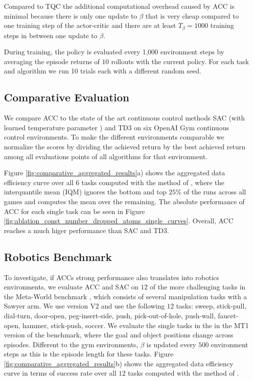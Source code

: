 Compared to TQC the additional computational overhead caused by ACC is minimal because there is only one update to $\beta$ that is very cheap compared to one training step of the actor-critic and there are at least $T_\beta =1000$ training steps in between one update to $\beta$.





During training, the policy is evaluated every 1,000 environment steps by averaging the episode returns of $10$ rollouts with the current policy. For each task and algorithm we run 10 trials each with a different random seed.



\subsection{Comparative Evaluation}




We compare ACC to the state of the art continuous control methods SAC \cite{SAC} (with learned temperature parameter \cite{SACalgapp}) and TD3 \cite{td3} on six OpenAI Gym continuous control environments.
To make the different environments comparable we normalize the scores by dividing the achieved return by the best achieved return among all evaluations points of all algorithms for that environment.

Figure \ref{fig:comparative_aggregated_results}a)  shows the aggregated data efficiency curve over all $6$ tasks computed with the method of \cite{agarwal2021deep}, where the interquantile mean (IQM) ignores the bottom and top $25$\% of the runs across all games and computes the mean over the remaining. 
The absolute performance of ACC for each single task can be seen in Figure \ref{fig:ablation_const_number_dropped_atoms_single_curves}.
Overall, ACC reaches a much higer performance than SAC and TD3.


\subsection{Robotics Benchmark}
To investigate, if ACCs strong performance also translates into robotics environments, we evaluate ACC and SAC on $12$ of the more challenging tasks in the Meta-World benchmark \cite{yu2020meta}, which consists of several manipulation tasks with a Sawyer arm. We use version V2 and use the following $12$ tasks:
sweep, stick-pull, dial-turn, door-open, peg-insert-side, push, pick-out-of-hole, push-wall, faucet-open, hammer, stick-push, soccer.
We evaluate the single tasks in the in the MT1 version of the benchmark, where the goal and object positions change across episodes.
Different to the gym environments, $\beta$ is updated every $500$ environment steps as this is the episode length for these tasks.
Figure 
\ref{fig:comparative_aggregated_results}b)
shows the aggregated data efficiency curve in terms of success rate over all $12$ tasks computed with the method of \cite{agarwal2021deep}.


